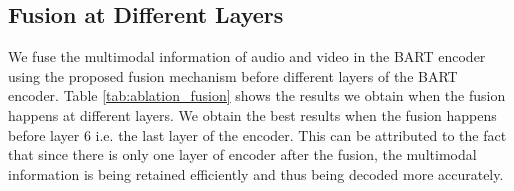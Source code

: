 \documentclass[11pt]{article}
\begin{document}
\begin{table}[h!]
\centering
{}
\caption{Cosine distance between three random samples from the dataset before and after fine-tuning. (PT: pre-trained; FT: fine-tuned)}
\label{tab:embed_cosine}
\end{table}

\subsection{Fusion at Different Layers}
\label{sec:app_fusion}
We fuse the multimodal information of audio and video in the BART encoder using the proposed fusion mechanism before different layers of the BART encoder. Table \ref{tab:ablation_fusion} shows the results we obtain when the fusion happens at different layers. We obtain the best results when the fusion happens before layer $6$ i.e. the last layer of the encoder. This can be attributed to the fact that since there is only one layer of encoder after the fusion, the multimodal information is being retained efficiently and thus being decoded more accurately.
\begin{table}[h!]
\centering
{}
\caption{ROUGE scores for fusion before different layers (R1/2/L: ROUGE1/2/L).}
\label{tab:ablation_fusion}
\end{table} 
\end{document}
